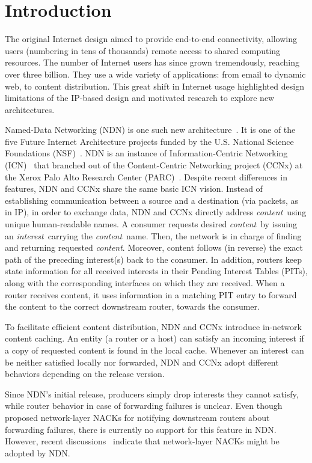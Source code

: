 \documentclass[conference]{IEEEtran}
\newcommand{\content}{{\em content}}
\newcommand{\interest}{{\em interest}}
\begin{document}
\section{Introduction}
\label{sec:intro}
The original Internet design aimed to provide end-to-end 
connectivity, allowing users (numbering in tens of thousands) remote access to shared computing
resources. The number of Internet users has since grown tremendously, 
reaching over three billion. They use a wide variety of applications:
from email to dynamic web, to content distribution. This great shift in Internet usage highlighted
design limitations of the IP-based design and motivated research to explore new architectures.

Named-Data Networking (NDN) is one such new architecture~\cite{NDN}. It is one of the five Future Internet 
Architecture projects funded by the U.S. National Science Foundations (NSF)~\cite{NSF-FIA}. NDN is an instance of 
Information-Centric Networking (ICN)~\cite{ahlgren2012survey} that branched out of the Content-Centric 
Networking project (CCNx) at the Xerox Palo Alto Research Center (PARC)~\cite{jacobson2009networking, 
content-centric}. Despite recent differences in features, NDN and CCNx  share the same basic ICN 
vision. Instead of establishing communication between a source and a destination (via packets, as
in IP), in order to exchange data, NDN and CCNx directly address \content\ using unique human-readable  
names.  A consumer requests desired \content\ by issuing an \interest\ carrying the \content\ name. Then, 
the network is in charge of finding and returning requested \content.
Moreover, content follows (in reverse) the exact path of the preceding interest(s)  back to the 
consumer. In addition, routers keep state information for all received interests 
in their Pending Interest Tables (PITs), along with the corresponding interfaces on which they are received. 
When a router receives content, it uses information in a matching PIT entry to forward the content to the 
correct downstream router, towards the consumer.

To facilitate efficient content distribution, NDN and CCNx introduce in-network content caching. 
An entity (a router or a host) can satisfy an incoming interest if a copy of requested content 
is found in the local cache. Whenever an interest can be neither satisfied locally nor
forwarded, NDN and CCNx adopt different behaviors 
depending on the release version. 

Since NDN's initial release, producers simply drop interests they 
cannot satisfy, while router behavior in case of forwarding failures is unclear. 
Even though~\cite{yi2012adaptive} proposed network-layer NACKs for notifying downstream 
routers about forwarding failures, there is currently no support for this feature in NDN. 
However, recent discussions~\cite{nacksndnsim2015} indicate that network-layer NACKs might be
adopted by NDN. 
\end{document}
